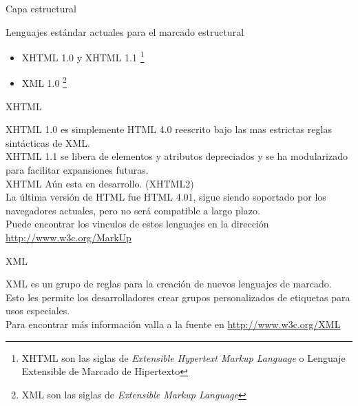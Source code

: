 \documentclass{beamer}
\begin{document}
\begin{frame}{Capa estructural} %
\begin{center}
    Lenguajes estándar actuales para el marcado estructural
    \begin{itemize}
        \item XHTML 1.0 y XHTML 1.1 \footnote{XHTML son las siglas de
        \textit{Extensible Hypertext Markup Language} o Lenguaje Extensible de
        Marcado de Hipertexto}
        \item XML 1.0 \footnote{XML son las siglas de \textit{Extensible Markup
        Language}} 
    \end{itemize}
\end{center}
\end{frame}

\begin{frame}{XHTML} %
    \begin{center}
        XHTML 1.0 es simplemente HTML 4.0 reescrito bajo las mas estrictas
        reglas sintácticas de XML. \\[0.5cm]
        \pause
        XHTML 1.1 se libera de elementos y atributos depreciados y se ha
        modularizado para facilitar expansiones futuras.\\[0.5cm]
        \pause
        XHTML Aún esta en desarrollo. (XHTML2)\\[0.5cm]
        \pause
        La última versión de HTML fue HTML 4.01, sigue siendo soportado por los
        navegadores actuales, pero no será compatible a largo plazo.\\[0.5cm]
        \pause
        Puede encontrar los vinculos de estos lenguajes en la dirección
        \url{http://www.w3c.org/MarkUp}
    \end{center}
\end{frame}

\begin{frame}{XML} %
    \begin{center}
       XML es un grupo de reglas para la creación de nuevos lenguajes de
       marcado.  \\[0.5cm]

       Esto les permite los desarrolladores crear grupos personalizados de
       etiquetas para usos especiales. \\[0.5cm]

       Para encontrar más información valla a la fuente en
       \url{http://www.w3c.org/XML}
    \end{center}
\end{frame}
\end{document}
